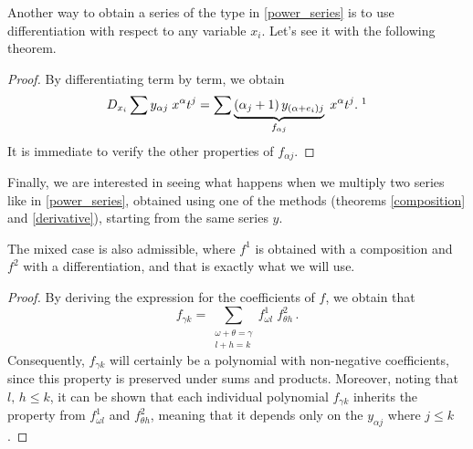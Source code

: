 Another way to obtain a series of the type in \eqref{power_series} is to use differentiation with respect to any variable $x_i$. Let’s see it with the following theorem.
\begin{theorem}[Differentiation]\label{derivative}
\end{theorem}
\begin{proof} By differentiating term by term, we obtain
$$ D_{x_i} \sum y_{\alpha j} \; x^\alpha t^j = \sum  \underbrace{(\alpha_j+1) \, y_{(\alpha+e_i)j}}_{f_{\alpha j}} \; x^\alpha t^j. \; \footnotemark$$ 
It is immediate to verify the other properties of $f_{\alpha j}$.
\end{proof}

Finally, we are interested in seeing what happens when we multiply two series like in \eqref{power_series}, obtained using one of the methods (theorems \ref{composition} and \ref{derivative}), starting from the same series $y$.
\begin{theorem}\label{product}
\end{theorem}

\begin{remark}
The mixed case is also admissible, where $f^1$ is obtained with a composition and $f^2$ with a differentiation, and that is exactly what we will use.
\end{remark}

\begin{proof} By deriving the expression for the coefficients of $f$, we obtain that
$$f_{\gamma k} = \sum_{\substack{\omega+\theta=\gamma \\ l+h=k}} f^1_{\omega l}\;  f^2_{\theta h}\, .$$
Consequently, $f_{\gamma k}$ will certainly be a polynomial with non-negative coefficients, since this property is preserved under sums and products. Moreover, noting that $l,\, h \leq k$, it can be shown that each individual polynomial $f_{\gamma k}$ inherits the property from $f^1_{\omega l}$ and $f^2_{\theta h}$, meaning that it depends only on the $y_{\alpha j}$ where $j \leq k$.
\end{proof}
